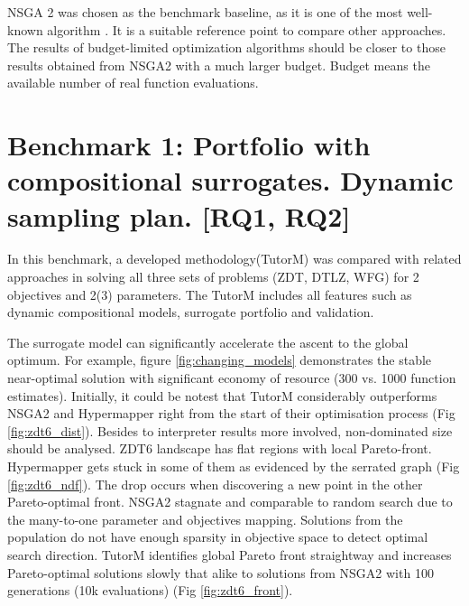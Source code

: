     NSGA 2 was chosen as the benchmark baseline, as it is one of the most well-known algorithm \cite{RamirezRV19}. It is a suitable reference point to compare other approaches. The results of budget-limited optimization algorithms should be closer to those results obtained from NSGA2 with a much larger budget. Budget means the available number of real function evaluations.

\section{Benchmark 1: Portfolio with compositional surrogates. Dynamic sampling plan. [RQ1, RQ2]}
    In this benchmark, a developed methodology(TutorM) was compared with related approaches in solving all three sets of problems (ZDT, DTLZ, WFG) for 2 objectives and 2(3) parameters. The TutorM includes all features such as dynamic compositional models, surrogate portfolio and validation.

    The surrogate model can significantly accelerate the ascent to the global optimum. For example, figure \ref{fig:changing_models} demonstrates the stable near-optimal solution with significant economy of resource (300 vs. 1000 function estimates).
    Initially, it could be notest that TutorM considerably outperforms NSGA2 and Hypermapper right from the start of their optimisation process (Fig \ref{fig:zdt6_dist}). Besides to interpreter results more involved, non-dominated size should be analysed. ZDT6 landscape has flat regions with local Pareto-front. Hypermapper gets stuck in some of them as evidenced by the serrated graph (Fig \ref{fig:zdt6_ndf}). The drop occurs when discovering a new point in the other Pareto-optimal front. NSGA2 stagnate and comparable to random search due to the many-to-one parameter and objectives mapping. Solutions from the population do not have enough sparsity in objective space to detect optimal search direction. TutorM identifies global Pareto front straightway and increases Pareto-optimal solutions slowly that alike to solutions from NSGA2 with 100 generations (10k evaluations) (Fig \ref{fig:zdt6_front}).

